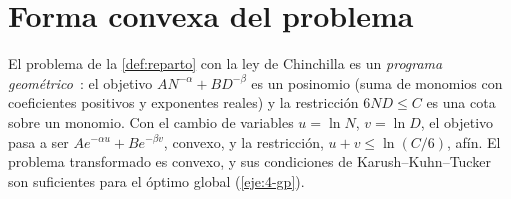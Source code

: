 \section{Forma convexa del problema}

El problema de la \cref{def:reparto} con la ley de Chinchilla es un \emph{programa geométrico}~\cite[§4.5]{bv}: el objetivo $AN^{-\alpha}+BD^{-\beta}$ es un posinomio (suma de monomios con coeficientes positivos y exponentes reales) y la restricción $6ND\le C$ es una cota sobre un monomio. Con el cambio de variables $u=\ln N$, $v=\ln D$, el objetivo pasa a ser $Ae^{-\alpha u}+Be^{-\beta v}$, convexo, y la restricción, $u+v\le\ln(C/6)$, afín. El problema transformado es convexo, y sus condiciones de Karush--Kuhn--Tucker son suficientes para el óptimo global (\cref{eje:4-gp}).

